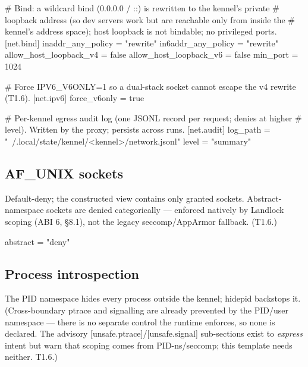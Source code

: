 \begin{kennelcode}
# Bind: a wildcard bind (0.0.0.0 / ::) is rewritten to the kennel's private
# loopback address (so dev servers work but are reachable only from inside the
# kennel's address space); host loopback is not bindable; no privileged ports.
[net.bind]
inaddr_any_policy = "rewrite"
in6addr_any_policy = "rewrite"
allow_host_loopback_v4 = false
allow_host_loopback_v6 = false
min_port = 1024
\end{kennelcode}

\begin{kennelcode}
# Force IPV6_V6ONLY=1 so a dual-stack socket cannot escape the v4 rewrite (T1.6).
[net.ipv6]
force_v6only = true
\end{kennelcode}

\begin{kennelcode}
# Per-kennel egress audit log (one JSONL record per request; denies at higher
# level). Written by the proxy; persists across runs.
[net.audit]
log_path = "~/.local/state/kennel/<kennel>/network.jsonl"
level = "summary"
\end{kennelcode}

\hypertarget{af_unix-sockets}{%
\subsection{AF\_UNIX sockets}\label{af_unix-sockets}}

Default-deny; the constructed view contains only granted sockets.
Abstract- namespace sockets are denied categorically --- enforced
natively by Landlock scoping (ABI 6, §8.1), not the legacy
seccomp/AppArmor fallback. (T1.6.)

\begin{kennelcode}
[unix]
abstract = "deny"
\end{kennelcode}

\hypertarget{process-introspection}{%
\subsection{Process introspection}\label{process-introspection}}

The PID namespace hides every process outside the kennel; hidepid
backstops it. (Cross-boundary ptrace and signalling are already
prevented by the PID/user namespace --- there is no separate control the
runtime enforces, so none is declared. The advisory
{[}unsafe.ptrace{]}/{[}unsafe.signal{]} sub-sections exist to
\emph{express} intent but warn that scoping comes from PID-ns/seccomp;
this template needs neither. T1.6.)

